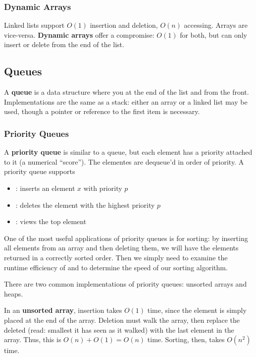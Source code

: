 \documentclass[12pt]{article}
\begin{document}
\subsubsection{Dynamic Arrays}
Linked lists support $O(1)$ insertion and deletion, $O(n)$ accessing. Arrays are vice-versa. {\bf Dynamic arrays} offer a compromise: $O(1)$ for both, but can only insert or delete from the end of the list.

\subsection{Queues}
A {\bf queue} is a data structure where you  at the end of the list and  from the front. Implementations are the same as a stack: either an array or a linked list may be used, though a pointer or reference to the first item is necessary.

\subsubsection{Priority Queues}
A {\bf priority queue} is similar to a queue, but each element has a priority attached to it (a numerical ``score''). The elementes are dequeue'd in order of priority. A priority queue supports
\begin{itemize}
\item {}: inserts an element $x$ with priority $p$
\item {}: deletes the element with the highest priority $p$
\item {}: views the top element
\end{itemize}

One of the most useful applications of priority queues is for sorting: by inserting all elements from an array and then deleting them, we will have the elements returned in a correctly sorted order. Then we simply need to examine the runtime efficiency of  and  to determine the speed of our sorting algorithm.

There are two common implementations of priority queues: unsorted arrays and heaps.

In an {\bf unsorted array}, insertion takes $O(1)$ time, since the element is simply placed at the end of the array. Deletion must walk the array, then replace the deleted (read: smallest it has seen as it walked) with the last element in the array. Thus, this is $O(n) + O(1) = O(n)$ time. Sorting, then, takes $O(n^2)$ time.
\end{document}
